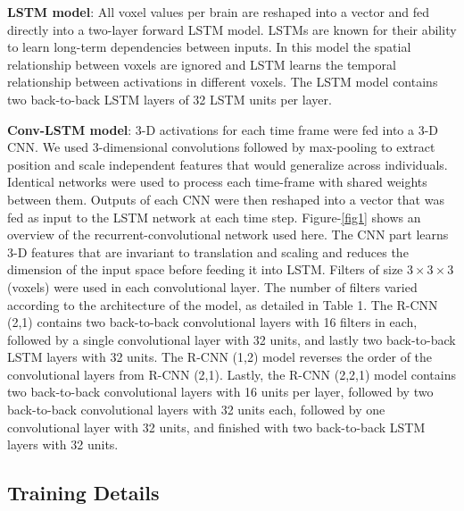 \documentclass{article}
\begin{document}
\textbf{LSTM model}: All voxel values per brain are reshaped into a vector and fed directly into a two-layer forward LSTM model. LSTMs are known for their ability to learn long-term dependencies between inputs. In this model the spatial relationship between voxels are ignored and LSTM learns the temporal relationship between activations in different voxels. The LSTM model contains two back-to-back LSTM layers of 32 LSTM units per layer.

\textbf{Conv-LSTM model}: 3-D activations for each time frame were fed into a 3-D CNN. We used 3-dimensional convolutions followed by max-pooling to extract position and scale independent features that would generalize across individuals. Identical networks were used to process each time-frame with shared weights between them. Outputs of each CNN were then reshaped into a vector that was fed as input to the LSTM network at each time step. Figure-\ref{fig1} shows an overview of the recurrent-convolutional network used here. The CNN part learns 3-D features that are invariant to translation and scaling and reduces the dimension of the input space before feeding it into LSTM. Filters of size $3\times3\times3$ (voxels) were used in each convolutional layer. The number of filters varied according to the architecture of the model, as detailed in Table 1.
The R-CNN (2,1) contains two back-to-back convolutional layers with 16 filters in each, followed by a single convolutional layer with 32 units, and lastly two back-to-back LSTM layers with 32 units. The R-CNN (1,2) model reverses the order of the convolutional layers from R-CNN (2,1). Lastly, the R-CNN (2,2,1) model contains two back-to-back convolutional layers with 16 units per layer, followed by two back-to-back convolutional layers with 32 units each, followed by one convolutional layer with 32 units, and finished with two back-to-back LSTM layers with 32 units. 

\subsection{Training Details}
\label{training_details}
\end{document}
